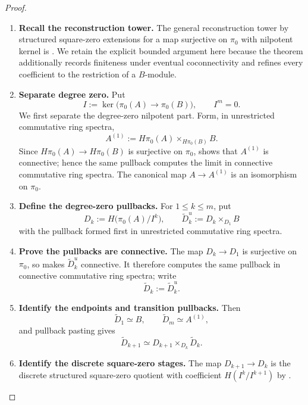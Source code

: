 \begin{proof}
\leavevmode
\begin{enumerate}[label=\textup{(\arabic*)}]
    \item \textbf{Recall the reconstruction tower.}
    The general reconstruction tower by structured square-zero extensions for a
    map surjective on \(\pi_0\) with nilpotent kernel is
    \cite[Lemma~2.1.14]{LurieDAGXIV}. We retain the explicit bounded argument
    here because the theorem additionally records finiteness under eventual
    coconnectivity and refines every coefficient to the restriction of a
    \(B\)-module.
    \item \textbf{Separate degree zero.}
    Put
    \[
        I:=\ker\bigl(\pi_0(A)\to\pi_0(B)\bigr),
        \qquad
        I^m=0.
    \]
    We first separate the degree-zero nilpotent part. Form, in unrestricted
    commutative ring spectra,
    \[
        A^{(1)}
        :=
        H\pi_0(A)\times_{H\pi_0(B)}B.
    \]
    Since \(H\pi_0(A)\to H\pi_0(B)\) is surjective on \(\pi_0\),
     shows that \(A^{(1)}\) is connective;
    hence the same pullback computes the limit in connective commutative ring
    spectra. The canonical map \(A\to A^{(1)}\) is an isomorphism on \(\pi_0\).
    \item \textbf{Define the degree-zero pullbacks.}
    For \(1\leq k\leq m\), put
    \[
        D_k:=H\bigl(\pi_0(A)/I^k\bigr),
        \qquad
        \widetilde D_k^u:=D_k\times_{D_1}B
    \]
    with the pullback formed first in unrestricted commutative ring spectra.
    \item \textbf{Prove the pullbacks are connective.}
    The map \(D_k\to D_1\) is surjective on \(\pi_0\), so
     makes
    \(\widetilde D_k^u\) connective. It therefore computes the same pullback
    in connective commutative ring spectra; write
    \[
        \widetilde D_k:=\widetilde D_k^u.
    \]
    \item \textbf{Identify the endpoints and transition pullbacks.}
    Then
    \[
        \widetilde D_1\simeq B,
        \qquad
        \widetilde D_m\simeq A^{(1)},
    \]
    and pullback pasting gives
    \[
        \widetilde D_{k+1}
        \simeq
        D_{k+1}\times_{D_k}\widetilde D_k.
    \]
    \item \textbf{Identify the discrete square-zero stages.}
    The map \(D_{k+1}\to D_k\) is the discrete structured square-zero
    quotient with coefficient \(H(I^k/I^{k+1})\) by
    .

\end{enumerate}
\end{proof}
